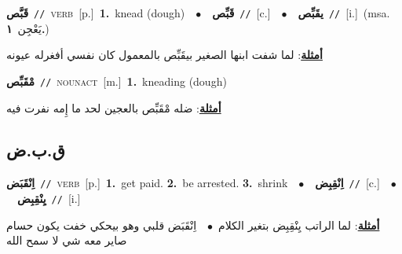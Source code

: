 \documentclass[10pt,a4paper,twoside]{article} %
\begin{document}
\begin{multicols}{2}
{\setlength\topsep{0pt}\textbf{\foreignlanguage{arabic}{قَبَّص}}\ {\color{gray}\texttt{//}\color{black}}\ \textsc{verb}\ [p.]\ \textbf{1.}~knead (dough)\ \ $\bullet$\ \ \setlength\topsep{0pt}\textbf{\foreignlanguage{arabic}{قَبِّص}}\ {\color{gray}\texttt{//}\color{black}}\ [c.]\ \ $\bullet$\ \ \setlength\topsep{0pt}\textbf{\foreignlanguage{arabic}{يقَبِّص}}\ {\color{gray}\texttt{//}\color{black}}\ [i.]\ \color{gray}(msa. \foreignlanguage{arabic}{يَعْجِن}~\foreignlanguage{arabic}{\textbf{١.}})\color{black}\  \begin{flushright}\color{gray}\foreignlanguage{arabic}{\textbf{\underline{\foreignlanguage{arabic}{أمثلة}}}: لما شفت ابنها الصغير بيقَبِّص بالمعمول كان نفسي أفغرله عيونه}\end{flushright}\color{black}} \vspace{2mm}

{\setlength\topsep{0pt}\textbf{\foreignlanguage{arabic}{مْقَبِّص}}\ {\color{gray}\texttt{//}\color{black}}\ \textsc{noun\textunderscore act}\ [m.]\ \textbf{1.}~kneading (dough)\  \begin{flushright}\color{gray}\foreignlanguage{arabic}{\textbf{\underline{\foreignlanguage{arabic}{أمثلة}}}: ضله مْقَبِّص بالعجين لحد ما إِمه نفرت فيه}\end{flushright}\color{black}} \vspace{2mm}

\vspace{-3mm}
\subsection*{\color{blue}\foreignlanguage{arabic}{ق.ب.ض}\color{blue}{}} 

{\setlength\topsep{0pt}\textbf{\foreignlanguage{arabic}{اِنْقَبَض}}\ {\color{gray}\texttt{//}\color{black}}\ \textsc{verb}\ [p.]\ \textbf{1.}~get paid.  \textbf{2.}~be arrested.  \textbf{3.}~shrink\ \ $\bullet$\ \ \setlength\topsep{0pt}\textbf{\foreignlanguage{arabic}{اِنْقِبِض}}\ {\color{gray}\texttt{//}\color{black}}\ [c.]\ \ $\bullet$\ \ \setlength\topsep{0pt}\textbf{\foreignlanguage{arabic}{يِنْقِبِض}}\ {\color{gray}\texttt{//}\color{black}}\ [i.]\  \begin{flushright}\color{gray}\foreignlanguage{arabic}{\textbf{\underline{\foreignlanguage{arabic}{أمثلة}}}: لما الراتب يِنْقِبِض بتغير الكلام\ $\bullet$\ \  اِنْقَبَض قلبي وهو بيحكي خفت يكون حسام صاير معه شي لا سمح الله}\end{flushright}\color{black}} \vspace{2mm}


\end{multicols}
\end{document}
